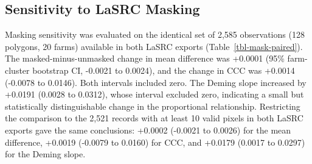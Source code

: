 \documentclass[remotesensing,article,submit,pdftex,oneauthor]{Definitions/mdpi}
\begin{document}
\subsection{Sensitivity to LaSRC Masking}\label{sec-masking-sensitivity}

Masking sensitivity was evaluated on the identical set of 2,585
observations (128 polygons, 20 farms) available in both LaSRC exports
(Table~\ref{tbl-mask-paired}). The masked-minus-unmasked change in mean
difference was +0.0001 (95\% farm-cluster bootstrap CI, -0.0021 to
0.0024), and the change in CCC was +0.0014 (-0.0078 to 0.0146). Both
intervals included zero. The Deming slope increased by +0.0191 (0.0028
to 0.0312), whose interval excluded zero, indicating a small but
statistically distinguishable change in the proportional relationship.
Restricting the comparison to the 2,521 records with at least 10 valid
pixels in both LaSRC exports gave the same conclusions: +0.0002 (-0.0021
to 0.0026) for the mean difference, +0.0019 (-0.0079 to 0.0160) for CCC,
and +0.0179 (0.0017 to 0.0297) for the Deming slope.
\end{document}
